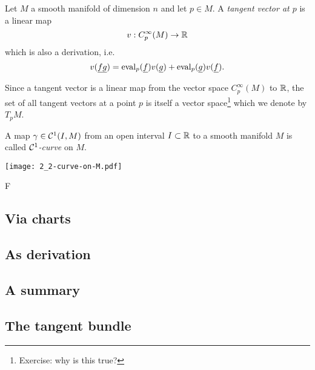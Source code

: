 \begin{defn}
    Let $M$ a smooth manifold of dimension $n$ and let $p\in M$.
    A \emph{tangent vector at $p$} is a linear map
    \begin{equation}
        v: C_p^\infty(M)\to\mathbb{R}
    \end{equation}
    which is also a derivation, i.e.
    \begin{equation}
        v(\underline f \underline g) =
            \operatorname{eval}_p(\underline f)v(\underline g)
            + \operatorname{eval}_p(\underline g)v(\underline f).
    \end{equation}

    Since a tangent vector is a linear map from the vector space $C_p^\infty(M)$ to $\mathbb{R}$, the set of all tangent vectors at a point $p$ is itself a vector space\footnote{Exercise: why is this true?} which we denote by $T_p M$.
\end{defn}



\textcolor{red}{\hrulefill}

A map $\gamma\in\mathcal{C}^1(I, M)$ from an open interval $I\subset\mathbb{R}$ to a smooth manifold $M$ is called \emph{$\mathcal{C}^1$-curve} on $M$.
\begin{marginfigure}
  \texttt{[image: 2\_2-curve-on-M.pdf]}
\end{marginfigure}
F
\subsection{Via charts}
\subsection{As derivation}

\subsection{A summary}

\subsection{The tangent bundle}